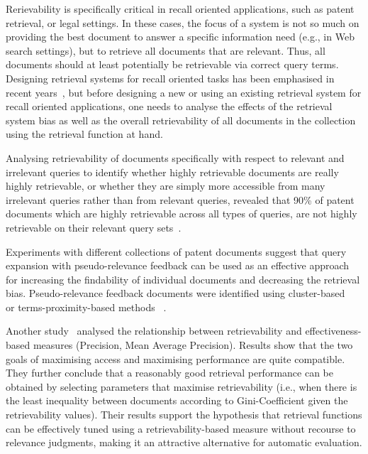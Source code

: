 Rerievability is specifically critical in recall oriented applications, such as patent retrieval, or legal settings. In these cases, the focus of a system is not so much on providing the best document to answer a specific information
need (e.g., in Web search settings), but to retrieve all documents that are relevant. Thus, all documents should at least potentially be retrievable via correct query terms. Designing retrieval systems for recall oriented tasks has been emphasised in recent years~\citep{fujii2007introduction, kontostathis2008effect}, but before designing a new or using an existing retrieval system for recall oriented applications, one needs to analyse the effects of the retrieval system bias as well as the overall retrievability of all documents in the collection using the retrieval function at hand.

Analysing retrievability of documents specifically with respect to relevant and irrelevant queries to identify whether highly retrievable documents are really highly retrievable, or whether they are simply more accessible from many irrelevant queries rather than from relevant queries, revealed that 90\% of patent documents which are highly retrievable across all types of queries, are not highly retrievable on their relevant query sets~\citep{bashir2009analyzing}.

Experiments with different collections of patent documents suggest that query expansion with pseudo-relevance feedback can be used as an effective approach for increasing the findability of individual documents and decreasing the retrieval bias. Pseudo-relevance feedback documents were identified using cluster-based ~\citep{bashir2009improving} or terms-proximity-based methods ~\citep{bashir2010improving}.

Another study~\citep{bache2010improving} analysed the relationship between retrievability and effectiveness-based measures (Precision, Mean Average Precision). Results show that the two goals of maximising access and maximising performance are quite compatible. They further conclude that a reasonably good retrieval performance can be obtained by selecting parameters that maximise retrievability (i.e., when there is the least inequality between documents according to Gini-Coefficient given the retrievability values). Their results support the hypothesis that retrieval functions can be effectively tuned using a retrievability-based measure without recourse to relevance judgments, making it an attractive alternative for automatic evaluation.
